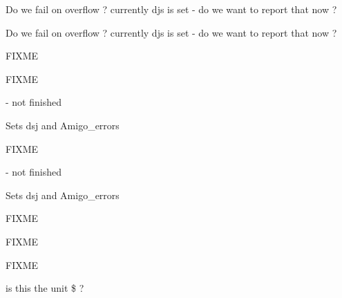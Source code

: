 
\begin{DoxyRefList}
\item[\label{todo__todo000005}%
\hypertarget{todo__todo000005}{}%
Global \hyperlink{amigo_8h_a4934ae332e168979dbb865a9948de88b}{amigo\-\_\-buffered\-\_\-read} (void)]Do we fail on overflow ? currently djs is set -\/ do we want to report that now ?  
\item[\label{todo__todo000005}%
\hypertarget{todo__todo000005}{}%
Global \hyperlink{amigo_8h_a4934ae332e168979dbb865a9948de88b}{amigo\-\_\-buffered\-\_\-read} (void)]Do we fail on overflow ? currently djs is set -\/ do we want to report that now ?  
\item[\label{todo__todo000008}%
\hypertarget{todo__todo000008}{}%
Global \hyperlink{amigo_8h_ae61925e6fb971862b8b0390c67bc164c}{amigo\-\_\-cmd\-\_\-clear} (void)]F\-I\-X\-M\-E 
\item[\label{todo__todo000008}%
\hypertarget{todo__todo000008}{}%
Global \hyperlink{amigo_8h_ae61925e6fb971862b8b0390c67bc164c}{amigo\-\_\-cmd\-\_\-clear} (void)]F\-I\-X\-M\-E 
\item[\label{todo__todo000006}%
\hypertarget{todo__todo000006}{}%
Global \hyperlink{amigo_8h_a1893674c480c08927066d7e10029d01c}{amigo\-\_\-cmd\-\_\-wakeup} (void)]-\/ not finished
\begin{DoxyItemize}
\item Sets dsj and Amigo\-\_\-errors
\end{DoxyItemize}

F\-I\-X\-M\-E  
\item[\label{todo__todo000006}%
\hypertarget{todo__todo000006}{}%
Global \hyperlink{amigo_8h_a1893674c480c08927066d7e10029d01c}{amigo\-\_\-cmd\-\_\-wakeup} (void)]-\/ not finished
\begin{DoxyItemize}
\item Sets dsj and Amigo\-\_\-errors
\end{DoxyItemize}

F\-I\-X\-M\-E  
\item[\label{todo__todo000009}%
\hypertarget{todo__todo000009}{}%
Global \hyperlink{amigo_8h_a2fc6f1413199d33d2b32e675dd45e181}{Amigo\-\_\-\-Command} (int secondary)]F\-I\-X\-M\-E 

F\-I\-X\-M\-E 

is this the unit \$ ? 


\end{DoxyRefList}
